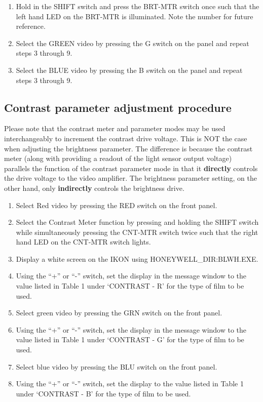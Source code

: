 \begin{enumerate}
\item Hold in the SHIFT switch and press the BRT-MTR switch once such that
the left hand LED on the BRT-MTR is illuminated. Note the number for
future reference.

\item Select the GREEN video by pressing the G switch on the panel and repeat
steps 3 through 9.

\item Select the BLUE video by pressing the B switch on the panel and repeat
steps 3 through 9.

\end{enumerate}

\subsection {\bf Contrast parameter adjustment procedure}

Please note that the contrast meter and parameter modes may be used
interchangeably to increment the contrast drive voltage.
This is
NOT the case when adjusting the brightness parameter. The difference is
because the contrast meter (along with providing a readout of the light sensor
output voltage) parallels the function of the contrast parameter mode
in that it {\bf directly} controls the drive voltage to the video amplifier.
The brightness parameter setting, on the other hand, only {\bf indirectly}
controls the brightness drive.

\begin{enumerate}

\item Select Red video by pressing the RED switch on the front panel.

\item Select the Contrast Meter function by pressing and holding the
SHIFT switch while simultaneously pressing the CNT-MTR switch twice
such that the right hand LED on the CNT-MTR switch lights.

\item Display a white screen on the IKON using HONEYWELL\_DIR:BLWH.EXE.

\item Using the ``+'' or ``-'' switch, set the display in the message window to
the value listed in Table 1 under `CONTRAST - R' for the type
of film to be used.

\item Select green video by pressing the GRN switch on the front panel.

\item Using the ``+'' or ``-'' switch, set the display in the message window
to the value listed in Table 1 under `CONTRAST - G' for the
type of film to be used.

\item Select blue video by pressing the BLU switch on the front panel.

\item Using the ``+'' or ``-'' switch, set the display to the value listed in
Table 1 under `CONTRAST - B' for the type of film to be
used.

\end {enumerate}

